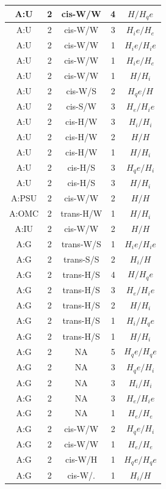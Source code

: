 \begin{center}
\begin{longtable}{c|c|c|c|c}
A:U & 2 & cis-W/W & 4 & $H/H_qe$ \\  \hline
A:U & 2 & cis-W/W & 3 & $H_ie/H_e$ \\  \hline
A:U & 2 & cis-W/W & 1 & $H_ie/H_ie$ \\  \hline
A:U & 2 & cis-W/W & 1 & $H_ie/H_e$ \\  \hline
A:U & 2 & cis-W/W & 1 & $H/H_i$ \\  \hline
A:U & 2 & cis-W/S & 2 & $H_qe/H$ \\  \hline
A:U & 2 & cis-S/W & 3 & $H_e/H_ie$ \\  \hline
A:U & 2 & cis-H/W & 3 & $H_i/H_i$ \\  \hline
A:U & 2 & cis-H/W & 2 & $H/H$ \\  \hline
A:U & 2 & cis-H/W & 1 & $H/H_i$ \\  \hline
A:U & 2 & cis-H/S & 3 & $H_qe/H_i$ \\  \hline
A:U & 2 & cis-H/S & 3 & $H/H_i$ \\  \hline
A:PSU & 2 & cis-W/W & 2 & $H/H$ \\  \hline
A:OMC & 2 & trans-H/W & 1 & $H/H_i$ \\  \hline
A:IU & 2 & cis-W/W & 2 & $H/H$ \\  \hline
A:G & 2 & trans-W/S & 1 & $H_ie/H_ie$ \\  \hline
A:G & 2 & trans-S/S & 2 & $H_i/H$ \\  \hline
A:G & 2 & trans-H/S & 4 & $H/H_qe$ \\  \hline
A:G & 2 & trans-H/S & 3 & $H_e/H_ie$ \\  \hline
A:G & 2 & trans-H/S & 2 & $H/H_i$ \\  \hline
A:G & 2 & trans-H/S & 1 & $H_i/H_qe$ \\  \hline
A:G & 2 & trans-H/S & 1 & $H/H_i$ \\  \hline
A:G & 2 & NA & 5 & $H_qe/H_qe$ \\  \hline
A:G & 2 & NA & 3 & $H_qe/H_i$ \\  \hline
A:G & 2 & NA & 3 & $H_i/H_i$ \\  \hline
A:G & 2 & NA & 3 & $H_e/H_ie$ \\  \hline
A:G & 2 & NA & 1 & $H_e/H_e$ \\  \hline
A:G & 2 & cis-W/W & 2 & $H_qe/H_i$ \\  \hline
A:G & 2 & cis-W/W & 1 & $H_e/H_e$ \\  \hline
A:G & 2 & cis-W/H & 1 & $H_qe/H_qe$ \\  \hline
A:G & 2 & cis-W/. & 1 & $H_i/H$ \\  \hline

\end{longtable}
\end{center}
